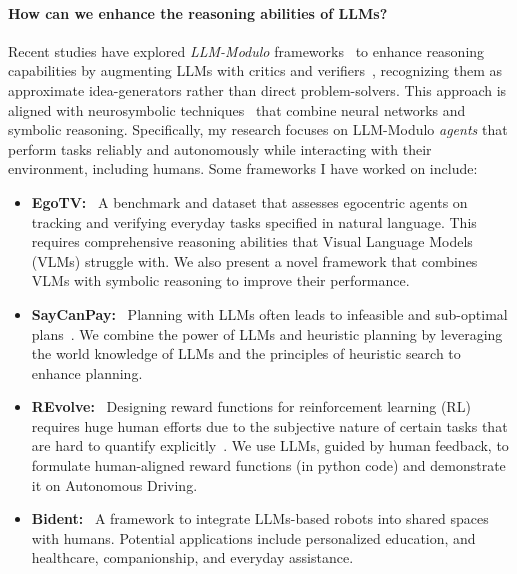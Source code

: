 \documentclass[11pt]{article}
\begin{document}
\paragraph{How can we enhance the reasoning abilities of LLMs?}
Recent studies have explored \emph{LLM-Modulo} frameworks~\cite{llm_modulo_frameworks} to enhance reasoning capabilities by augmenting LLMs with critics and verifiers~\cite{verify_step_by_step,saycanpay}, recognizing them as approximate idea-generators rather than direct problem-solvers. This approach is aligned with neurosymbolic techniques~\cite{deraedt2020statistical} that combine neural networks and symbolic reasoning. Specifically, my research focuses on LLM-Modulo \emph{agents} that perform tasks reliably and autonomously while interacting with their environment, including humans. Some frameworks I have worked on include:

\begin{itemize}[leftmargin=*]
  \item \textbf{EgoTV:}~\cite{egotv} A benchmark and dataset that assesses egocentric agents on tracking and verifying everyday tasks specified in natural language. This requires comprehensive reasoning abilities that Visual Language Models (VLMs) struggle with. We also present a novel framework that combines VLMs with symbolic reasoning to improve their performance. 
  \item \textbf{SayCanPay:}~\cite{saycanpay} Planning with LLMs often leads to infeasible and sub-optimal plans~\cite{valmeekam2023planning}. We combine the power of LLMs and heuristic planning by leveraging the world knowledge of LLMs and the principles of heuristic search to enhance planning.
  \item \textbf{REvolve:}~\cite{revolve} Designing reward functions for reinforcement learning (RL) requires huge human efforts due to the subjective nature of certain tasks that are hard to quantify explicitly~\cite{reward_misdesign_ad}. We use LLMs, guided by human feedback, to formulate human-aligned reward functions (in python code) and demonstrate it on Autonomous Driving.
  \item \textbf{Bident:}~\cite{bident} A framework to integrate LLMs-based robots into shared spaces with humans. Potential applications include personalized education, and healthcare, companionship, and everyday assistance.
\end{itemize}

\end{document}
